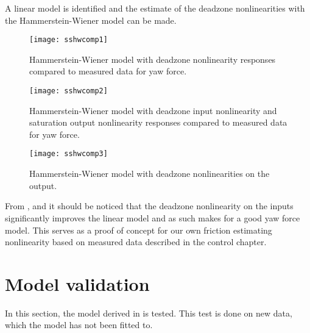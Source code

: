A linear model is identified and the estimate of the deadzone nonlinearities with the Hammerstein-Wiener model can be made.


\begin{figure}[H]
\centering
\hspace{-2.5em}\texttt{[image: sshwcomp1]}
\caption{Hammerstein-Wiener model with deadzone nonlinearity responses compared to measured data for yaw force.}
\label{fig:2LMI}
\end{figure}

\begin{figure}[H]
\centering
\hspace{-2.5em}\texttt{[image: sshwcomp2]}
\caption{Hammerstein-Wiener model with deadzone input nonlinearity and saturation output nonlinearity responses compared to measured data for yaw force.}
\label{fig:2LMI1}
\end{figure}

\begin{figure}[H]
\centering
\hspace{-2.5em}\texttt{[image: sshwcomp3]}
\caption{Hammerstein-Wiener model with deadzone nonlinearities on the output.}
\label{fig:2LMI2}
\end{figure}

From ,  and  it should be noticed that the deadzone nonlinearity on the inputs significantly improves the linear model and as such makes for a good yaw force model.
This serves as a proof of concept for our own friction estimating nonlinearity based on measured data described in the control chapter.

\section{Model validation} \label{se:mdval}
In this section, the model derived in  is tested. This test is done on new data, which the model has not been fitted to.



